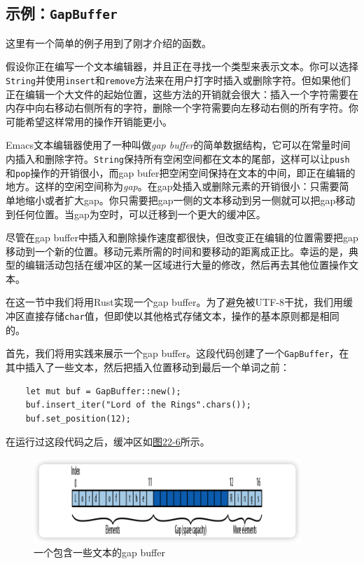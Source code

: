 \subsection{示例：\texttt{GapBuffer}}
这里有一个简单的例子用到了刚才介绍的函数。

假设你正在编写一个文本编辑器，并且正在寻找一个类型来表示文本。你可以选择\texttt{String}并使用\texttt{insert}和\texttt{remove}方法来在用户打字时插入或删除字符。但如果他们正在编辑一个大文件的起始位置，这些方法的开销就会很大：插入一个字符需要在内存中向右移动右侧所有的字符，删除一个字符需要向左移动右侧的所有字符。你可能希望这样常用的操作开销能更小。

Emacs文本编辑器使用了一种叫做\emph{gap buffer}的简单数据结构，它可以在常量时间内插入和删除字符。\texttt{String}保持所有空闲空间都在文本的尾部，这样可以让\texttt{push}和\texttt{pop}操作的开销很小，而gap bufer把空闲空间保持在文本的中间，即正在编辑的地方。这样的空闲空间称为\emph{gap}。在gap处插入或删除元素的开销很小：只需要简单地缩小或者扩大gap。你只需要把gap一侧的文本移动到另一侧就可以把gap移动到任何位置。当gap为空时，可以迁移到一个更大的缓冲区。

尽管在gap buffer中插入和删除操作速度都很快，但改变正在编辑的位置需要把gap移动到一个新的位置。移动元素所需的时间和要移动的距离成正比。幸运的是，典型的编辑活动包括在缓冲区的某一区域进行大量的修改，然后再去其他位置操作文本。

在这一节中我们将用Rust实现一个gap buffer。为了避免被UTF-8干扰，我们用缓冲区直接存储\texttt{char}值，但即使以其他格式存储文本，操作的基本原则都是相同的。

首先，我们将用实践来展示一个gap buffer。这段代码创建了一个\texttt{GapBuffer}，在其中插入了一些文本，然后把插入位置移动到最后一个单词之前：
\begin{verbatim}
    let mut buf = GapBuffer::new();
    buf.insert_iter("Lord of the Rings".chars());
    buf.set_position(12);
\end{verbatim}

在运行过这段代码之后，缓冲区如\hyperref[f22-6]{图22-6}所示。
\begin{figure}[htbp]
    \centering
    \includegraphics[width=0.9\textwidth]{../img/f22-6.png}
    \caption{一个包含一些文本的gap buffer}
    \label{f22-6}
\end{figure}

